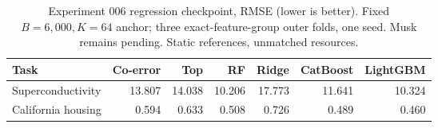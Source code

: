 \begin{table}[t]
\centering\small
\begin{tabular}{lrrrrrr}
\toprule
Task & Co-error & Top & RF & Ridge & CatBoost & LightGBM \\
\midrule
Superconductivity & 13.807 & 14.038 & 10.206 & 17.773 & 11.641 & 10.324 \\
California housing & 0.594 & 0.633 & 0.508 & 0.726 & 0.489 & 0.460 \\
\bottomrule
\end{tabular}
\caption{Experiment 006 regression checkpoint, RMSE (lower is better). Fixed $B=6,000,K=64$ anchor; three exact-feature-group outer folds, one seed. Musk remains pending. Static references, unmatched resources.}
\end{table}
